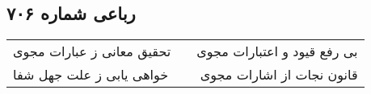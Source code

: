 \begin{center}
\section*{رباعی شماره ۷۰۶}
\label{sec:sh706}
\begin{longtable}{l p{0.5cm} r}
تحقیق معانی ز عبارات مجوی
&&
بی رفع قیود و اعتبارات مجوی
\\
خواهی یابی ز علت جهل شفا
&&
قانون نجات از اشارات مجوی
\\
\end{longtable}
\end{center}

